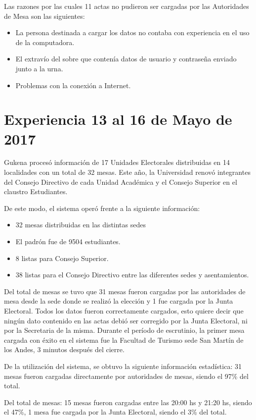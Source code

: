 Las razones por las cuales 11 actas no pudieron ser cargadas por las Autoridades de Mesa son las siguientes:
\begin{itemize}
\item La persona destinada a cargar los datos no contaba con experiencia en el uso de la computadora.
\item El extravío del sobre que contenía datos de usuario y contraseña enviado junto a la urna.
\item Problemas con la conexión a Internet.
\end{itemize}

\section{Experiencia 13 al 16 de Mayo de 2017}
Gukena procesó información de 17 Unidades Electorales distribuidas en 14 localidades con un total de 32 mesas. Este año, la Universidad renovó integrantes del Consejo Directivo de cada Unidad Académica y el Consejo Superior en el claustro Estudiantes.

De este modo, el sistema operó frente a la siguiente información:
\begin{itemize}
    \item 32 mesas distribuidas en las distintas sedes
    \item El padrón fue de 9504 estudiantes.
    \item 8 listas para Consejo Superior.
    \item 38 listas para el Consejo Directivo entre las diferentes sedes y asentamientos.
\end{itemize}
  
Del total de mesas se tuvo que 31 mesas fueron cargadas por las autoridades de mesa desde la sede donde se realizó la elección y 1 fue cargada por la Junta Electoral. Todos los datos fueron correctamente cargados, esto quiere decir que ningún dato contenido en las actas debió ser corregido por la Junta Electoral, ni por la Secretaria de la misma.
Durante el período de escrutinio, la primer mesa cargada con éxito en el sistema fue la Facultad de Turismo sede San Martín de los Andes, 3 minutos después del cierre.

De la utilización del sistema, se obtuvo la siguiente información estadística:
31 mesas fueron cargadas directamente por autoridades de mesas, siendo el 97\% del total.

Del total de mesas:
15 mesas fueron cargadas entre las 20:00 hs y 21:20 hs, siendo el 47\%,
1 mesa fue cargada 	por la Junta Electoral, siendo el 3\% del total.

